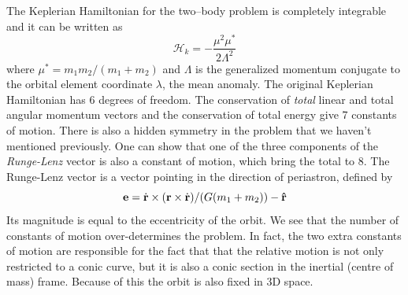 \documentclass[ twoside,openright,titlepage,numbers=noenddot,headinclude,%
                footinclude=true,cleardoublepage=empty,abstractoff, %
                BCOR=5mm,paper=a4,fontsize=11pt,%
                american,%
                ]{scrreprt}
\begin{document}
The Keplerian Hamiltonian for the two--body problem is completely 
integrable and it can be written as
\begin{equation}
    \mathcal{H}_k=- \frac{\mu^2\mu^*}{2\Lambda^2} 
\end{equation}
where $\mu^*=m_1m_2/(m_1+m_2)$ and $\Lambda$ is the generalized
momentum conjugate to the orbital element coordinate $\lambda$,
the mean anomaly. The original Keplerian Hamiltonian has 6 
degrees of freedom. The conservation of \emph{total} linear and total
angular momentum vectors and the conservation of total energy
give 7 constants of motion. There is also a hidden symmetry in
the problem that we haven't mentioned previously. One can show that
one of the three components of the 
\emph{Runge-Lenz} vector is also a constant of motion, which 
bring the total to 8. The Runge-Lenz vector is a vector pointing
in the direction of periastron, defined by
\begin{equation}
    \boldsymbol{\mathbf{e}}=\dot{\boldsymbol{\mathbf{r}}}\times(\boldsymbol{\mathbf{r}}\times\dot{\boldsymbol{\mathbf{r}}})
    /(G(m_1+m_2)) - \boldsymbol{\mathbf{\hat r}}
\end{equation}
Its magnitude is equal to the eccentricity of the orbit. We 
see that the number of constants of motion over-determines the 
problem. In fact, the two extra constants of motion are responsible
for the fact that that the relative motion is not only restricted to 
a conic curve, but it is also a conic section in the inertial
(centre of mass) frame. Because of this the orbit is also fixed in
3D space.
\end{document}
